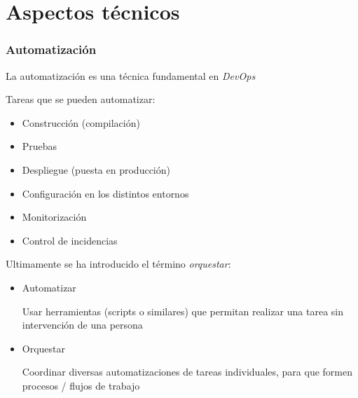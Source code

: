\documentclass[ucs]{beamer}
\begin{document}
\section{Aspectos técnicos}


\begin{frame}[fragile]
\frametitle{Automatización}
La automatización es una técnica fundamental en 
\emph{DevOps}

Tareas que se pueden automatizar:

\begin{itemize}
\item
Construcción (compilación)
\item
Pruebas
\item
Despliegue (puesta en producción)
\item
Configuración en los distintos entornos
\item
Monitorización
\item
Control de incidencias
\end{itemize}

Ultimamente se ha introducido el término \emph{orquestar}:

\begin{itemize}
\item
Automatizar 

Usar herramientas (scripts o similares) que permitan realizar una tarea sin intervención de una persona

\item
Orquestar 

Coordinar diversas automatizaciones de tareas individuales, para que formen procesos / flujos de trabajo
\end{itemize}
\end{frame}
\end{document}
